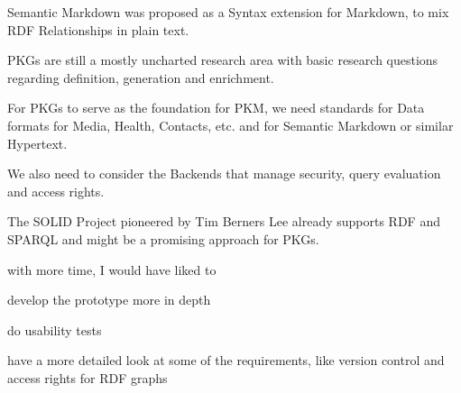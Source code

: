 Semantic Markdown was proposed as a Syntax extension for Markdown, to mix RDF Relationships in plain text.

PKGs are still a mostly uncharted research area with basic research questions regarding definition, generation and enrichment. 

For PKGs to serve as the foundation for PKM, we need standards for Data formats for Media, Health, Contacts, etc. and for Semantic Markdown or similar Hypertext.

We also need to consider the Backends that manage security, query evaluation and access rights. 

The SOLID Project pioneered by Tim Berners Lee already supports RDF and SPARQL and might be a promising approach for PKGs.



with more time, I would have liked to 

develop the prototype more in depth

do usability tests

have a more detailed look at some of the requirements, like version control and access rights for RDF graphs